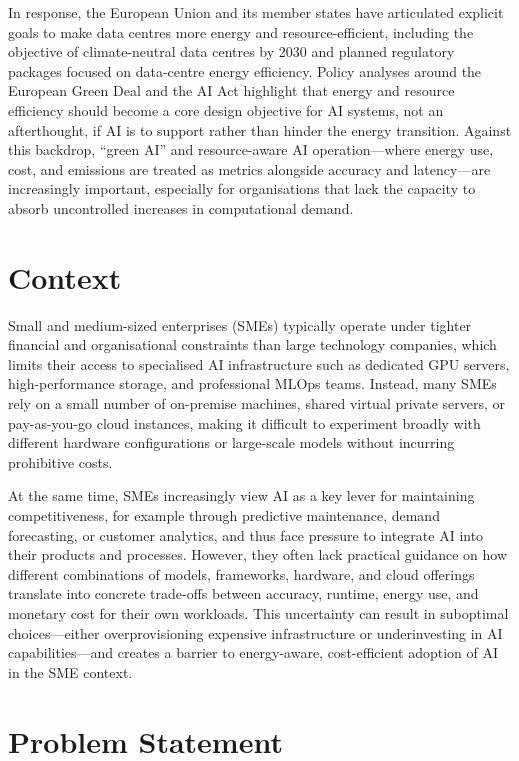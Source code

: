 In response, the European Union and its member states have articulated explicit goals to make data centres more energy
and resource-efficient, including the objective of climate-neutral data centres by 2030 and planned regulatory packages
focused on data-centre energy efficiency. Policy analyses around the European Green Deal and the AI Act highlight that 
energy and resource efficiency should become a core design objective for AI systems, not an afterthought, if AI is to support 
rather than hinder the energy transition. Against this backdrop, “green AI” and resource-aware AI operation—where energy use, 
cost, and emissions are treated as metrics alongside accuracy and latency—are increasingly important, especially for
organisations that lack the capacity to absorb uncontrolled increases in computational demand.

\section{Context}

Small and medium-sized enterprises (SMEs) typically operate under tighter financial and organisational 
constraints than large technology companies, which limits their access to specialised AI infrastructure
such as dedicated GPU servers, high-performance storage, and professional MLOps teams. 
Instead, many SMEs rely on a small number of on-premise machines, shared virtual private servers, 
or pay-as-you-go cloud instances, making it difficult to experiment broadly with different hardware 
configurations or large-scale models without incurring prohibitive costs.

At the same time, SMEs increasingly view AI as a key lever for maintaining competitiveness, 
for example through predictive maintenance, demand forecasting, or customer analytics, and thus 
face pressure to integrate AI into their products and processes. However, they often lack practical 
guidance on how different combinations of models, frameworks, hardware, and cloud offerings translate 
into concrete trade-offs between accuracy, runtime, energy use, and monetary cost for their own 
workloads. This uncertainty can result in suboptimal choices—either overprovisioning expensive 
infrastructure or underinvesting in AI capabilities—and creates a barrier to energy-aware, 
cost-efficient adoption of AI in the SME context.

\section{Problem Statement}


